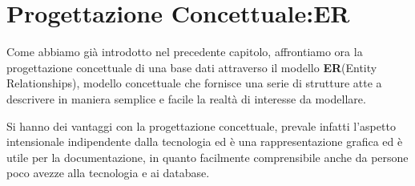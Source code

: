 \documentclass[a4paper,12pt, oneside]{book}
\begin{document}
\chapter{Progettazione Concettuale:ER}
Come abbiamo già introdotto nel precedente capitolo, affrontiamo ora la progettazione concettuale di una base dati attraverso
il modello \textbf{ER}(Entity Relationships), modello concettuale che fornisce una serie di strutture
atte a descrivere in maniera semplice e facile la realtà di interesse da modellare.

Si hanno dei vantaggi con la progettazione concettuale, prevale infatti l'aspetto intensionale indipendente
dalla tecnologia ed è una rappresentazione grafica ed è utile per la documentazione, in quanto facilmente comprensibile anche
da persone poco avezze alla tecnologia e ai database.
\end{document}
